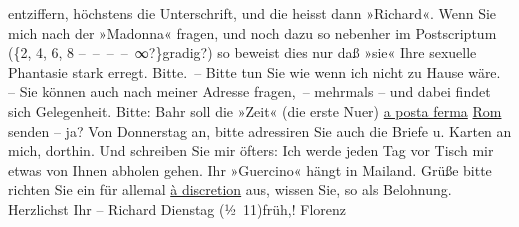 \begin{ledgroupsized}[t]{13cm}
                    entziffern, höchstens die Unterschrift, und die heisst dann »Richard«. Wenn Sie
                    mich nach der
                    »Madonna«
                    fragen, und noch dazu so nebenher im Postscriptum ({\{}2, 4, 6, 8 – – – – ∞?{\}}gradig?) so beweist dies nur daß »sie«
                    Ihre sexuelle Phantasie stark erregt. Bitte. – Bitte tun Sie wie wenn ich nicht
                    zu Hause wäre. – Sie können auch nach meiner Adresse fragen, – mehrmals – {\pb}und dabei findet sich
                    Gelegenheit.\pend
           \pstart
           Bitte: Bahr soll die »Zeit« (die erste Nu{\geminationm}er) \uline{a posta ferma}{ }\uline{Rom} senden – ja? Von Donnerstag an, bitte adressiren Sie auch die
                    Briefe u. Karten an mich, dorthin. Und schreiben Sie mir öfters: Ich werde jeden
                    Tag vor Tisch mir etwas von Ihnen abholen gehen. Ihr »Guercino« hängt in Mailand. Grüße bitte richten
                    Sie ein für allemal \uline{à discretion} aus, wissen
                    Sie, so als Belohnung. Herzlichst Ihr –\pend
           \pstart \spacefill\mbox{Richard}\pend{}\pstart
           Dienstag{ }\introOben{}(½ 11)\introOben{}{ }früh,! Florenz\pend
           \endnumbering{}\end{ledgroupsized}  \newcommand{\dateiname}{L00375}\newcommand{\titel}{Richard Beer-Hofmann an Arthur Schnitzler, [2. 10. 1894]}\newcommand{\editorInnen}{ Martin Anton Müller und Gerd-Hermann Susen}
      